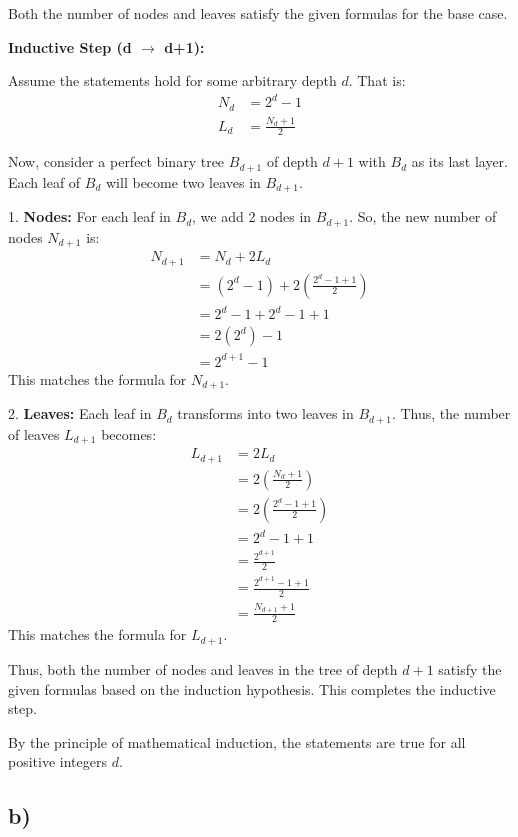 \documentclass[12pt]{article}
\begin{document}
Both the number of nodes and leaves satisfy the given formulas for the base case.

\textbf{Inductive Step (d \(\rightarrow\) d+1):}

Assume the statements hold for some arbitrary depth \( d \). That is:
\begin{align*}
N_d &= 2^d - 1 \\
L_d &= \frac{N_d + 1}{2}
\end{align*}

Now, consider a perfect binary tree \( B_{d+1} \) of depth \( d+1 \) with \( B_d \) as its last layer. Each leaf of \( B_d \) will become two leaves in \( B_{d+1} \).

1. \textbf{Nodes:} For each leaf in \( B_d \), we add 2 nodes in \( B_{d+1} \). So, the new number of nodes \( N_{d+1} \) is:
\begin{align*}
N_{d+1} &= N_d + 2L_d \\
&= (2^d - 1) + 2 \left( \frac{2^d - 1 + 1}{2} \right) \\
&= 2^d - 1 + 2^d - 1 + 1 \\
&= 2(2^d) - 1 \\
&= 2^{d+1} - 1
\end{align*}
This matches the formula for \( N_{d+1} \).

2. \textbf{Leaves:} Each leaf in \( B_d \) transforms into two leaves in \( B_{d+1} \). Thus, the number of leaves \( L_{d+1} \) becomes:
\begin{align*}
L_{d+1} &= 2L_d \\
&= 2 \left( \frac{N_d + 1}{2} \right) \\
&= 2 \left( \frac{2^d - 1 + 1}{2} \right) \\
&= 2^d - 1 + 1 \\
&= \frac{2^{d+1}}{2}  \\
&= \frac{2^{d+1} - 1 +1}{2}  \\
&= \frac{N_{d+1} + 1}{2}
\end{align*}
This matches the formula for \( L_{d+1} \).

Thus, both the number of nodes and leaves in the tree of depth \( d+1 \) satisfy the given formulas based on the induction hypothesis. This completes the inductive step.

By the principle of mathematical induction, the statements are true for all positive integers \( d \).


\subsection*{b)}
\end{document}
